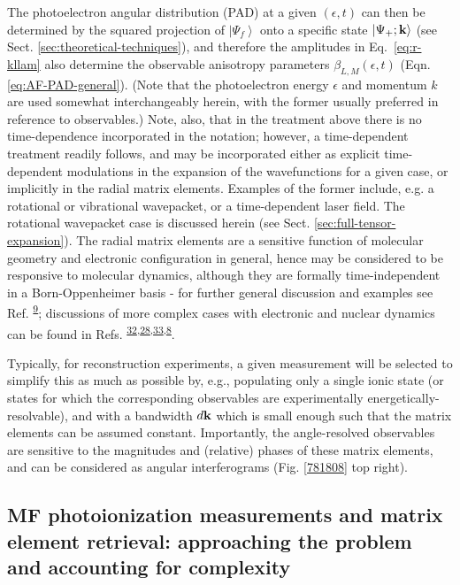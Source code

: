 \documentclass[10pt]{article}
\begin{document}
The photoelectron angular distribution (PAD) at a given $(\epsilon,t)$ can then be determined by the squared projection of $\left|\Psi_f\right>$ onto a specific state $\left|\Psi_{+};\bf{k}\right>$ (see Sect. \ref{sec:theoretical-techniques}), and therefore the amplitudes in Eq.~\ref{eq:r-kllam} also determine the observable anisotropy parameters $\beta_{L,M}(\epsilon,t)$ (Eqn. \ref{eq:AF-PAD-general}). (Note that the photoelectron energy $\epsilon$ and momentum $k$ are used somewhat interchangeably herein, with the former usually preferred in reference to observables.) Note, also, that in the treatment above there is no time-dependence incorporated in the notation; however, a time-dependent treatment readily follows, and may be incorporated either as explicit time-dependent modulations in the expansion of the wavefunctions for a given case, or implicitly in the radial matrix elements. Examples of the former include, e.g. a rotational or vibrational wavepacket, or a time-dependent laser field. The rotational wavepacket case is discussed herein (see Sect. \ref{sec:full-tensor-expansion}). The radial matrix elements are a sensitive function of molecular geometry and electronic configuration in general, hence may be considered to be responsive to molecular dynamics, although they are formally time-independent in a Born-Oppenheimer basis - for further general discussion and examples see Ref. \textsuperscript{\hyperref[csl:9]{9}}; discussions of more complex cases with electronic and nuclear dynamics can be found in Refs.  \textsuperscript{\hyperref[csl:32]{32},\hyperref[csl:28]{28},\hyperref[csl:33]{33},\hyperref[csl:8]{8}}.

Typically, for reconstruction experiments, a given measurement will be selected to simplify this as much as possible by, e.g., populating only a single ionic state (or states for which the corresponding observables are experimentally energetically-resolvable), and with a bandwidth $d\bf{k}$ which is small enough such that the matrix elements can be assumed constant. Importantly, the angle-resolved observables are sensitive to the magnitudes and (relative) phases of these matrix elements, and can be considered as angular interferograms (Fig. \ref{781808} top right).


\subsection{MF photoionization measurements and matrix element retrieval: approaching the problem and accounting for complexity\label{sec:MF-recon-basic-intro}}
\end{document}
